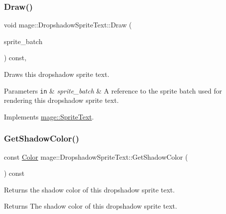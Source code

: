 \subsubsection{\texorpdfstring{Draw()}{Draw()}}
{\footnotesize\ttfamily void mage\+::\+Dropshadow\+Sprite\+Text\+::\+Draw (\begin{DoxyParamCaption}\item[{Sprite\+Batch \&}]{sprite\+\_\+batch }\end{DoxyParamCaption}) const\hspace{0.3cm}{\ttfamily [override]}, {\ttfamily [virtual]}}

Draws this dropshadow sprite text.


\begin{DoxyParams}[1]{Parameters}
\mbox{\tt in}  & {\em sprite\+\_\+batch} & A reference to the sprite batch used for rendering this dropshadow sprite text. \\
\hline
\end{DoxyParams}


Implements \hyperlink{classmage_1_1_sprite_text_a45d5ac8410d5a46b26e8491946a2ad9e}{mage\+::\+Sprite\+Text}.

\hypertarget{classmage_1_1_dropshadow_sprite_text_a776c11dfe60ad8c0c6f356c5f0f95af6}{}\label{classmage_1_1_dropshadow_sprite_text_a776c11dfe60ad8c0c6f356c5f0f95af6} 
\subsubsection{\texorpdfstring{Get\+Shadow\+Color()}{GetShadowColor()}}
{\footnotesize\ttfamily const \hyperlink{structmage_1_1_color}{Color} mage\+::\+Dropshadow\+Sprite\+Text\+::\+Get\+Shadow\+Color (\begin{DoxyParamCaption}{ }\end{DoxyParamCaption}) const}

Returns the shadow color of this dropshadow sprite text.

\begin{DoxyReturn}{Returns}
The shadow color of this dropshadow sprite text. 
\end{DoxyReturn}
\hypertarget{classmage_1_1_dropshadow_sprite_text_aedba26fc177c68e0553785a731d3d391}{}\label{classmage_1_1_dropshadow_sprite_text_aedba26fc177c68e0553785a731d3d391} 

